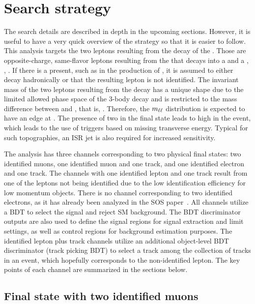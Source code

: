 \clearpage
\section{Search strategy}
\label{sec:search-strategy}

The search details are described in depth in the upcoming sections. However, it is useful to have a very quick overview of the strategy so that it is easier to follow. This analysis targets the two leptons resulting from the decay of the \neutt. Those are opposite-charge, same-flavor leptons \ellell resulting from the \neutt that decays into a \neuto and a \PZstar, \ie, \neuttdecay. If there is a \chargino present, such as in the production of \tchiwz, it is assumed to either decay hadronically or that the resulting lepton is not identified. The invariant mass of the two leptons resulting from the decay has a unique shape due to the limited allowed phase space of the 3-body decay and is restricted to the mass difference between \neutt and \neuto, that is, \dm. Therefore, the $m_{\ell\ell}$ distribution is expected to have an edge at \dm. The presence of two \neuto in the final state leads to high \MET in the event, which leads to the use of triggers based on missing transverse energy. Typical for such topographies, an ISR jet is also required for increased sensitivity.

The analysis has three channels corresponding to two physical final states: two identified muons, one identified muon and one track, and one identified electron and one track. The channels with one identified lepton and one track result from one of the leptons not being identified due to the low identification efficiency for low momentum objects. There is no channel corresponding to two identified electrons, as it has already been analyzed in the SOS paper~\cite{sos}. All channels utilize a BDT to select the signal and reject SM background. The BDT discriminator outputs are also used to define the signal regions for signal extraction and limit settings, as well as control regions for background estimation purposes. The identified lepton plus track channels utilize an additional object-level BDT discriminator (track picking BDT) to select a track among the collection of tracks in an event, which hopefully corresponds to the non-identified lepton. The key points of each channel are summarized in the sections below.


\subsection{Final state with two identified muons}
\label{sec:dimuon-category}

